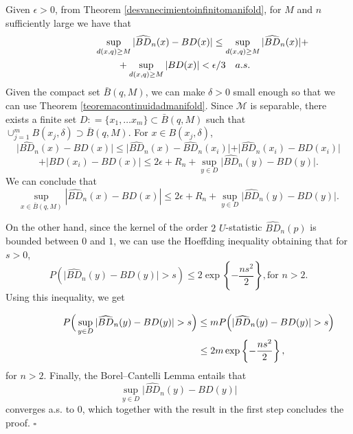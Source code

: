 \documentclass[a4paper]{article}
\newcommand*{\QEDB}{\hfill\ensuremath{\square}}%
\def\defeq{\mathrel{\mathop:}=}
\numberwithin{equation}{section}
\def\defeq{\mathrel{\mathop:}=}
\newcommand{\M}{\mbox{$\mathcal{M}$}}
\begin{document}
\begin{enumerate}[label=(\Alph*)]
Given $\epsilon >0$, from Theorem  \ref{desvanecimientoinfinitomanifold}, for $M$ and  $n$ sufficiently large we have that  
\begin{align*}
\sup_{d(x,q) \geq M } \vert \widehat{BD}_n(x) - BD(x) \vert \leq \sup_{d(x,q) \geq M } \vert \widehat{BD}_n(x)\vert + \\
 &\hspace{-7cm} + \sup_{d(x,q) \geq M } \vert BD(x) \vert < \epsilon/3 \quad a.s.
\end{align*}
Given the compact set $\bar{B}(q,M)$,  we can make $\delta>0$ small enough so that we can use Theorem  \ref{teoremacontinuidadmanifold}. Since $\M$ is separable, there exists a finite set
$D\defeq \{x_1, \ldots x_m\} \subset \bar{B}(q,M) $ such that $\cup_{j=1}^m B(x_j, \delta) \supset \bar{B}(q,M)$. For $x \in B(x_j, \delta)$,
$$\vert \widehat{BD}_n(x) - BD(x) \vert \leq \vert \widehat{BD}_n(x) - \widehat{BD}_n(x_i) \vert  + \vert \widehat{BD}_n(x_i) - BD(x_i) \vert $$
$$+ \vert BD(x_i) - BD(x) \vert  \leq 
 2\epsilon + R_n + \sup_{y \in D} \vert \widehat{BD}_n(y) - BD(y) \vert.$$
We can conclude that
$$\sup_{x \in \bar{B}(q,M)} \left \vert \widehat{BD}_n(x) - BD(x) \right \vert \leq 2\epsilon + R_n +\sup_{y \in D} \vert \widehat{BD}_n(y) - BD(y) \vert.$$

On the other hand, since the kernel of the order $2$ $U$-statistic  $\widehat{BD}_n(p)$ is bounded between $0$ and $1$, we can use the Hoeffding inequality   obtaining that for $s>0$, 
\begin{displaymath}
P\left( \vert \widehat{BD}_n(y) - BD(y) \vert> s \right) \leq  2 \exp \left\{ - \frac{ns^2}{2} \right\}, \textrm{for $n>2$}.
\end{displaymath}
Using this inequality, we get 

\begin{align*}
P \Big( \sup_{y \in D} \vert \widehat{BD}_n(y) - BD(y) \vert > s \Big)  \leq  m P \Big(\vert \widehat{BD}_n(y) - BD(y) \vert > s \Big)  \\
&  \hspace{-5 cm}  \leq 2 m \exp \left\{ - \frac{ns^2}{2} \right\},
\end{align*}
for $n>2$. Finally, the Borel--Cantelli Lemma entails that $$\sup_{y \in D} \vert \widehat{BD}_n(y) - BD(y) \vert$$ converges a.s. to 0, which together with the result in the first step concludes the proof. \QEDB 


\end{enumerate}
\end{document}
